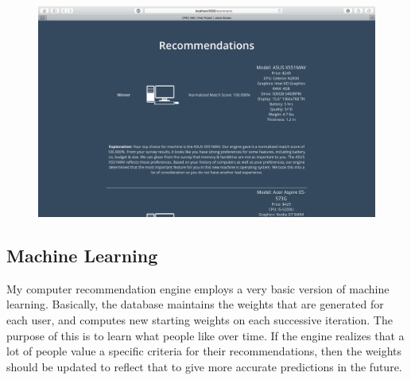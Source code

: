 \documentclass[10pt,letter]{article}
\begin{document}
 \begin{figure}[htbp]
    \centering
    \includegraphics[width=7.0in]{recommend.png}
\end{figure}

\subsection{Machine Learning}

My computer recommendation engine employs a very basic version of machine learning. Basically, the database maintains the weights that are generated for each user, and computes new starting weights on each successive iteration. The purpose of this is to learn what people like over time. If the engine realizes that a lot of people value a specific criteria for their recommendations, then the weights should be updated to reflect that to give more accurate predictions in the future.
\end{document}
